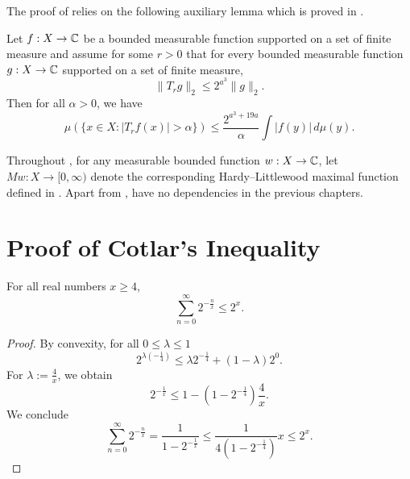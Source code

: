 The proof of  relies on the following auxiliary lemma which is proved in .
\begin{lemma}[Weak 1 1]
    \label{weak-1-1}
    Let $f:X\to{\mathbb{C}}$ be a bounded measurable function supported on a set of finite measure and assume for some $r>0$ that for every bounded measurable function $g:X\to{\mathbb{C}}$ supported on a set of finite measure,
    \begin{equation}
        \label{eq-strong-2-2-assumption}
        \|T_rg\|_{2}\le 2^{a^3} \|g\|_2.
    \end{equation}
    Then for all $\alpha>0$, we have
    \begin{equation}
        \label{eq-weak-1-1}
        \mu\left(\{x\in X: |T_r f(x)|>\alpha\}\right)\le \frac{2^{a^3 + 19a}}{\alpha} \int |f(y)|\, d\mu(y).
    \end{equation}
\end{lemma}
Throughout , for any measurable bounded function $w: X \to {\mathbb{C}}$, let $Mw: X \to [0, \infty)$ denote the corresponding Hardy--Littlewood maximal function defined in .
Apart from ,  have no dependencies in the previous chapters.



\section{Proof of Cotlar's Inequality}
\label{subsec-cotlar}

\begin{lemma}
    \label{geometric-series-estimate}
    For all real numbers $x\ge 4$,
    \begin{equation*}
        \sum_{n=0}^\infty 2^{-\frac{n}{x}} \le 2^x.
    \end{equation*}
\end{lemma}
\begin{proof}
    By convexity, for all $0\le\lambda\le1$
    \begin{equation*}
        2^{\lambda(-\frac{1}{4})} \le \lambda 2^{-\frac{1}{4}} + (1-\lambda)2^0.
    \end{equation*}
    For $\lambda:=\frac{4}{x}$, we obtain
    \begin{equation*}
        2^{-\frac 1 x} \le 1 - (1-2^{-\frac 1 4}) \frac{4}{x}.
    \end{equation*}
    We conclude
    \begin{equation*}
        \sum_{n=0}^\infty 2^{-\frac{n}{x}} = \frac{1}{1-2^{-\frac 1 x}} \le \frac{1}{4(1-2^{-\frac 1 4})} x \le 2^x.
    \end{equation*}
\end{proof}

